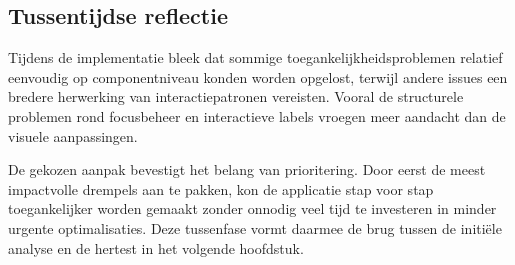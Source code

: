 \subsection{Tussentijdse reflectie}
\label{subsec:tussentijdse-reflectie}

Tijdens de implementatie bleek dat sommige toegankelijkheidsproblemen relatief eenvoudig op componentniveau konden worden opgelost, terwijl andere issues een bredere herwerking van interactiepatronen vereisten. Vooral de structurele problemen rond focusbeheer en interactieve labels vroegen meer aandacht dan de visuele aanpassingen.

De gekozen aanpak bevestigt het belang van prioritering. Door eerst de meest impactvolle drempels aan te pakken, kon de applicatie stap voor stap toegankelijker worden gemaakt zonder onnodig veel tijd te investeren in minder urgente optimalisaties. Deze tussenfase vormt daarmee de brug tussen de initiële analyse en de hertest in het volgende hoofdstuk.
